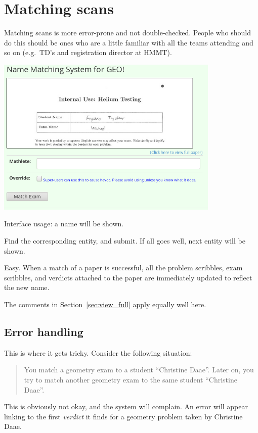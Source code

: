 \section{Matching scans}
Matching scans is more error-prone and not double-checked.
People who should do this should be ones who are a little familiar with
all the teams attending and so on (e.g.\ TD's and registration director at HMMT).

\begin{center}
	\includegraphics[width=0.8\textwidth]{images/papermatch.png}
\end{center}

Interface usage: a name will be shown.
\begin{itemize}
	\ii Find the corresponding entity, and submit.
	\ii If all goes well, next entity will be shown.
\end{itemize}
Easy.
When a match of a paper is successful,
all the problem scribbles, exam scribbles, and verdicts
attached to the paper are immediately updated to reflect the new name.

The comments in Section~\ref{sec:view_full} apply equally well here.

\subsection{Error handling}
This is where it gets tricky.
Consider the following situation:
\begin{quote}
	You match a geometry exam to a student ``Christine Daae''.  
	Later on, you try to match another geometry exam
	to the same student ``Christine Daae''.
\end{quote}
This is obviously not okay, and the system will complain.
An error will appear linking to the first \emph{verdict}
it finds for a geometry problem taken by Christine Daae.

